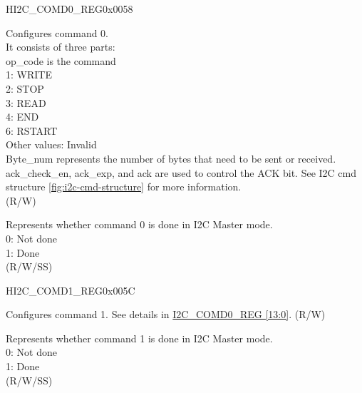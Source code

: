 \begin{register}{H}{I2C\_COMD0\_REG}{0x0058}\label{regdesc:I2CCOMD0REG}
%
%
%
\regnewline%
\begin{regdesc}\begin{reglist}
\label{fielddesc:I2CCOMMAND0}\item [I2C\_COMMAND0] Configures command 0. \\
It consists of three parts:\\ 
op\_code is the command\\ 
1: WRITE\\
2: STOP\\
3: READ\\
4: END\\
6: RSTART\\
Other values: Invalid \\
Byte\_num represents the number of bytes that need to be sent or received.\\
ack\_check\_en, ack\_exp, and ack are used to control the ACK bit. See I2C cmd structure \ref{fig:i2c-cmd-structure} for more information. \\(R/W)
\label{fielddesc:I2CCOMMAND0DONE}\item [I2C\_COMMAND0\_DONE] Represents whether command 0 is done in I2C Master mode.\\
0: Not done \\
1: Done \\ (R/W/SS)
\end{reglist}\end{regdesc}
\end{register}


\begin{register}{H}{I2C\_COMD1\_REG}{0x005C}\label{regdesc:I2CCOMD1REG}
%
%
%
\regnewline%
\begin{regdesc}\begin{reglist}
\label{fielddesc:I2CCOMMAND1}\item [I2C\_COMMAND1] Configures command 1. See details in \hyperref[regdesc:I2CCOMD0REG]{I2C\_COMD0\_REG [13:0]}. (R/W)
\label{fielddesc:I2CCOMMAND1DONE}\item [I2C\_COMMAND1\_DONE] Represents whether command 1 is done in I2C Master mode.\\
0: Not done \\
1: Done \\ (R/W/SS)
\end{reglist}\end{regdesc}
\end{register}


